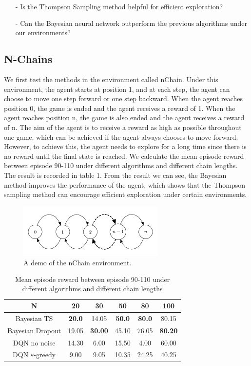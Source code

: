 \documentclass[a4paper,12pt]{article}
\begin{document}
\begin{itemize}
\item[-] Is the Thompson Sampling method helpful for efficient exploration?
\item[-] Can the Bayesian neural network outperform the previous algorithms under our environments?
\end{itemize}

\subsection{N-Chains}
We first test the methods in the environment called nChain. Under this environment, the agent starts at position 1, and at each step, the agent can choose to move one step forward or one step backward. When the agent reaches position 0, the game is ended and the agent receives a reward of 1. When the agent reaches position n, the game is also ended and the agent receives a reward of n. The aim of the agent is to receive a reward as high as possible throughout one game, which can be achieved if the agent always chooses to move forward. However, to achieve this, the agent needs to explore for a long time since there is no reward until the final state is reached. We calculate the mean episode reward between episode 90-110 under different algorithms and different chain lengths. The result is recorded in table 1. From the result we can see, the Bayesian method improves the performance of the agent, which shows that the Thompson sampling method can encourage efficient exploration under certain environments. 

\begin{figure}[htb!]
\center
\includegraphics[scale=0.85]{nchain_demo}
\caption{A demo of the nChain environment. }
\end{figure}

\begin{table}[htb!]
\center
\caption{Mean episode reward between episode 90-110 under different algorithms and different chain lengths}
\begin{tabular}{c | c c c c c}
\hline
N & 20 & 30 & 50 & 80 & 100\\
\hline
Bayesian TS & \textbf{20.0} & 14.05 & \textbf{50.0} & \textbf{80.0} & 80.15\\
Bayesian Dropout & 19.05 & \textbf{30.00} & 45.10 & 76.05 & \textbf{80.20}\\
DQN no noise  & 14.30 & 6.00 & 15.50 & 4.00 & 60.00\\
DQN $\varepsilon$-greedy & 9.00 & 9.05 & 10.35 & 24.25 & 40.25\\
\hline
\end{tabular}
\end{table}
\end{document}
